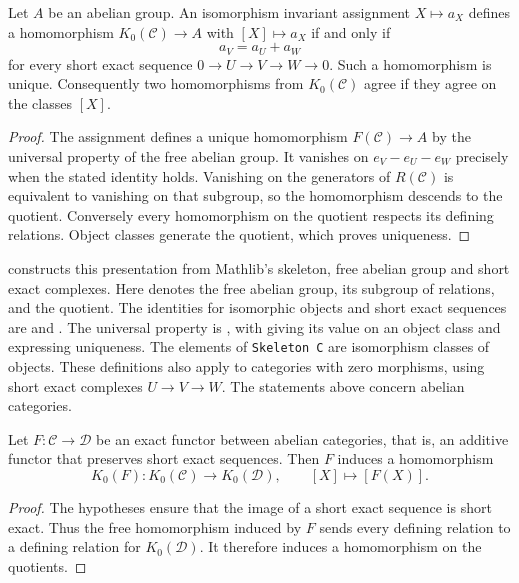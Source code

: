\begin{proposition}
\label{lib:kzero:universal}
Let $A$ be an abelian group. An isomorphism invariant assignment $X\mapsto a_X$
defines a homomorphism $K_0(\mathcal C)\to A$ with $[X]\mapsto a_X$ if and
only if
\[
 a_V=a_U+a_W
\]
for every short exact sequence $0\to U\to V\to W\to0$. Such a homomorphism is
unique. Consequently two homomorphisms from $K_0(\mathcal C)$ agree if they
agree on the classes $[X]$.
\end{proposition}
\begin{proof}
The assignment defines a unique homomorphism $F(\mathcal C)\to A$ by the
universal property of the free abelian group. It vanishes on
$e_V-e_U-e_W$ precisely when the stated identity holds. Vanishing on the
generators of $R(\mathcal C)$ is equivalent to vanishing on that subgroup,
so the homomorphism descends to the quotient. Conversely every homomorphism
on the quotient respects its defining relations. Object classes generate
the quotient, which proves uniqueness.
\end{proof}

\begin{implementation}
 constructs this presentation
from Mathlib's skeleton, free abelian group and short exact complexes. Here
 denotes the free abelian group,
 its subgroup of relations, and
 the quotient. The identities for isomorphic objects and
short exact sequences are  and
. The universal property is , with
 giving its value on an object class and
 expressing uniqueness. The elements of {\small\texttt{Skeleton C}}
are isomorphism classes of objects.
These definitions also apply to categories with zero morphisms, using
short exact complexes $U\to V\to W$. The statements above concern
abelian categories.
\end{implementation}

\begin{proposition}
\label{lib:kzero:functor}
Let $F:\mathcal C\to\mathcal D$ be an exact functor between abelian
categories, that is, an additive functor that preserves short exact
sequences. Then $F$ induces a homomorphism
\[
 K_0(F):K_0(\mathcal C)\longrightarrow K_0(\mathcal D),
 \qquad [X]\longmapsto[F(X)].
\]
\end{proposition}
\begin{proof}
The hypotheses ensure that the image of a short exact sequence is short
exact. Thus the free homomorphism induced by $F$ sends every defining
relation to a defining relation for $K_0(\mathcal D)$. It therefore induces a
homomorphism on the quotients.
\end{proof}

